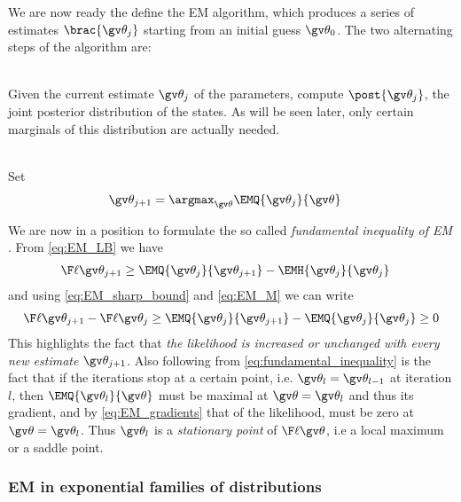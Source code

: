 We are now ready the define the EM algorithm, 
which produces a series of estimates $\brac{\Th_j}$
starting from an initial guess $\Th_0$. The two alternating
steps of the algorithm are:

\begin{description}
\addtolength{\leftskip}{1cm}
  \item[E-step]\hfill\\
  Given the current estimate $\Th_j$ of the parameters, compute	
  $\post{\Th_j}$, the joint posterior distribution of the states. 
  As will be seen later, only certain marginals of this distribution
  are actually needed.  
  \item[M-step]\hfill\\ 
  Set
    \begin{align}
		\Th_{j+1}&=\argmax_{\Th}\EMQ{\Th_j}{\Th} \label{eq:EM_M}
	\end{align}
\end{description}
We are now in a position to formulate the so called \emph{fundamental inequality of EM} \parencite{Cappe2005}.
From \eqref{eq:EM_LB} we have
\begin{align*}
	\lLH[\Th_{j+1}] & \geq \EMQ{\Th_j}{\Th_{j+1}} - \EMH{\Th_j}{\Th_{j}}
\end{align*}
and using \eqref{eq:EM_sharp_bound} and \eqref{eq:EM_M} we can write
\begin{align}
\label{eq:fundamental_inequality}	
\begin{split}	
	\lLH[\Th_{j+1}] - \lLH[\Th_j] & \geq \EMQ{\Th_j}{\Th_{j+1}} - \EMQ{\Th_j}{\Th_{j}} \geq 0\\
\end{split}
\end{align}
This highlights
the fact that \emph{the likelihood is increased or unchanged with every new estimate} $\Th_{j+1}$.
Also following from \eqref{eq:fundamental_inequality} is the fact that if the iterations
stop at a certain point, i.e. $\Th_{l}=\Th_{l-1}$ at iteration $l$, then
$\EMQ{\Th_l}{\Th}$ must be maximal at $\Th=\Th_l$ and thus its gradient, and 
by \eqref{eq:EM_gradients} that of the likelihood, must be zero at $\Th=\Th_l$. Thus
$\Th_l$ is a \emph{stationary point} of $\lLH$, i.e a local maximum or a saddle point.

\subsubsection{EM in exponential families of distributions}

